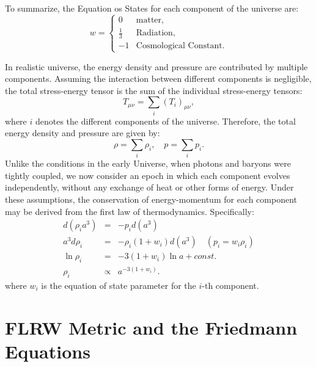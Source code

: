 To summarize, the Equation os States for each component of the universe are:
\begin{equation}
    w = 
    \begin{cases}
        0 & \text{matter}, \\
        \frac{1}{3} & \text{Radiation}, \\
        -1 & \text{Cosmological Constant}.
    \end{cases}
    \label{eq:equation_of_state_summary}
\end{equation}

In realistic universe, the energy density and pressure are contributed by multiple components. Assuming the interaction between different components is negligible, the total stress-energy tensor is the sum of the individual stress-energy tensors:
\begin{equation}
    T_{\mu\nu} = \sum_i (T_i)_{\mu\nu},
\end{equation}
where \( i \) denotes the different components of the universe. Therefore, the total energy density and pressure are given by:
\begin{equation}
    \rho = \sum_i \rho_i, \quad p = \sum_i p_i.
\end{equation}
Unlike the conditions in the early Universe, when photons and baryons were tightly coupled, we now consider an epoch in which each component evolves independently, without any exchange of heat or other forms of energy. Under these assumptions, the conservation of energy-momentum for each component may be derived from the first law of thermodynamics. Specifically:
\begin{eqnarray}
    d\left(\rho_i a^3\right) &=& -p_i d(a^3) \nonumber \\
    a^3 d\rho_i &=& -\rho_i (1 + w_i) d(a^3) \quad (p_i = w_i \rho_i) \nonumber \\
    \ln \rho_i &=& -3(1 + w_i) \ln a + const. \nonumber \\
    \rho_i &\propto& a^{-3(1 + w_i)}.
    \label{eq:energy_density_scaling}
\end{eqnarray}
where \( w_i \) is the equation of state parameter for the \( i \)-th component. 

\section{FLRW Metric and the Friedmann Equations}\label{sec:flrw_metric}
